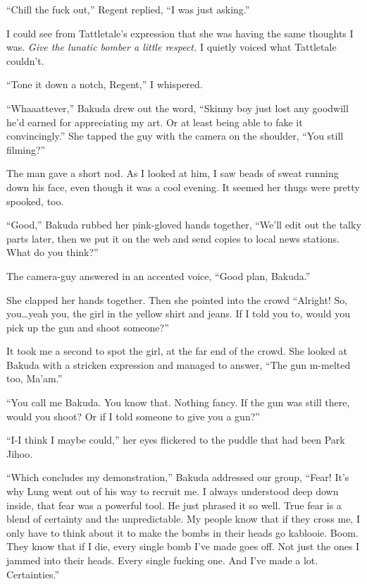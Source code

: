 ``Chill the fuck out,'' Regent replied, ``I was just asking.''



I could see from Tattletale's expression that she was having the same thoughts I was.  \emph{Give the lunatic bomber a little respect.}  I quietly voiced what Tattletale couldn't.



``Tone it down a notch, Regent,'' I whispered.



``Whaaattever,'' Bakuda drew out the word, ``Skinny boy just lost any goodwill he'd earned for appreciating my art.  Or at least being able to fake it convincingly.''  She tapped the guy with the camera on the shoulder, ``You still filming?''



The man gave a short nod.  As I looked at him, I saw beads of sweat running down his face, even though it was a cool evening.  It seemed her thugs were pretty spooked, too.



``Good,'' Bakuda rubbed her pink-gloved hands together, ``We'll edit out the talky parts later, then we put it on the web and send copies to local news stations.  What do you think?''



The camera-guy answered in an accented voice, ``Good plan, Bakuda.''



She clapped her hands together.  Then she pointed into the crowd  ``Alright!  So, you\ldots  yeah you, the girl in the yellow shirt and jeans.  If I told you to, would you pick up the gun and shoot someone?''



It took me a second to spot the girl, at the far end of the crowd.  She looked at Bakuda with a stricken expression and managed to answer, ``The gun m-melted too, Ma'am.''



``You call me Bakuda.  You know that.  Nothing fancy.  If the gun was still there, would you shoot?  Or if I told someone to give you a gun?''



``I-I think I maybe could,'' her eyes flickered to the puddle that had been Park Jihoo.



``Which concludes my demonstration,'' Bakuda addressed our group, ``Fear!  It's why Lung went out of his way to recruit me.  I always understood deep down inside, that fear was a powerful tool.  He just phrased it so well.  True fear is a blend of certainty and the unpredictable.  My people know that if they cross me, I only have to think about it to make the bombs in their heads go kablooie.  Boom.  They know that if I die, every single bomb I've made goes off.  Not just the ones I jammed into their heads.  Every single fucking one.  And I've made a lot.  Certainties.''



